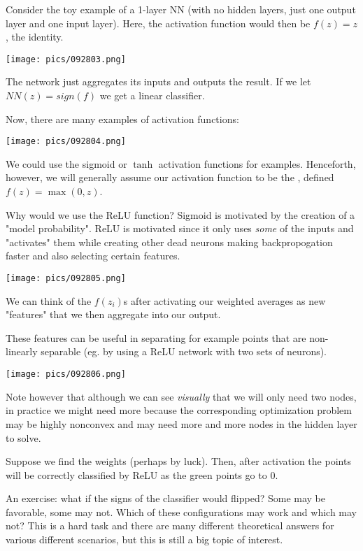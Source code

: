 \documentclass[11pt]{scrartcl}
\begin{document}
\begin{ex}
Consider the toy example of a 1-layer NN (with no hidden layers, just one output layer and one input layer). Here, the activation function would then be $f(z)=z$, the identity.  
\begin{center}
    \texttt{[image: pics/092803.png]}
\end{center}
The network just aggregates its inputs and outputs the result. If we let $NN(z)=sign(f)$ we get a linear classifier. 
\end{ex}
Now, there are many examples of activation functions: 
\begin{center}
    \texttt{[image: pics/092804.png]}
\end{center}
We could use the sigmoid or $\tanh$ activation functions for examples. Henceforth, however, we will generally assume our activation function to be the , defined $f(z)=\max(0,z)$. 

Why would we use the ReLU function? Sigmoid is motivated by the creation of a "model probability". ReLU is motivated since it only uses \textit{some} of the inputs and "activates" them while creating other dead neurons making backpropogation faster and also selecting certain features.
\begin{center}
    \texttt{[image: pics/092805.png]}
\end{center}
We can think of the $f(z_i)$s after activating our weighted averages as new "features" that we then aggregate into our output.

These features can be useful in separating for example points that are non-linearly separable (eg. by using a ReLU network with two sets of  neurons).
\begin{center}
    \texttt{[image: pics/092806.png]}
\end{center}

Note however that although we can see \textit{visually} that we will only need two nodes, in practice we might need more because the corresponding optimization problem may be highly nonconvex and may need more and more nodes in the hidden layer to solve. 

Suppose we find the weights (perhaps by luck). Then, after activation the points will be correctly classified by ReLU as the green points go to $0$. 

An exercise: what if the signs of the classifier would flipped? Some may be favorable, some may not. Which of these configurations may work and which may not? This is a hard task and there are many different theoretical answers for various different scenarios, but this is still a big topic of interest.
\end{document}
